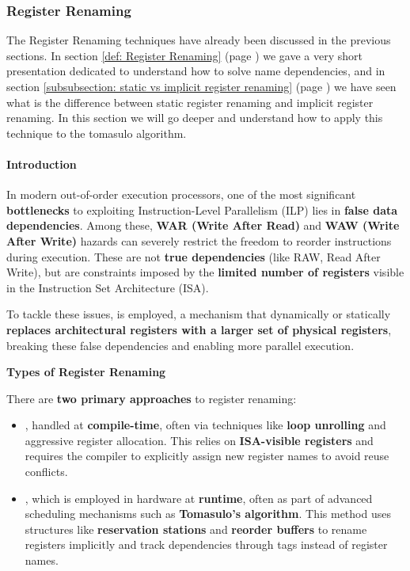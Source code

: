 \subsubsection{Register Renaming}

The Register Renaming techniques have already been discussed in the previous sections. In section \ref{def: Register Renaming} (page \pageref{def: Register Renaming}) we gave a very short presentation dedicated to understand how to solve name dependencies, and in section \ref{subsubsection: static vs implicit register renaming} (page \pageref{subsubsection: static vs implicit register renaming}) we have seen what is the difference between static register renaming and implicit register renaming. In this section we will go deeper and understand how to apply this technique to the tomasulo algorithm.

\paragraph{Introduction}

In modern out-of-order execution processors, one of the most significant \textbf{bottlenecks} to exploiting Instruction-Level Parallelism (ILP) lies in \textbf{false data dependencies}. Among these, \textbf{WAR (Write After Read)} and \textbf{WAW (Write After Write)} hazards can severely restrict the freedom to reorder instructions during execution. These are not \textbf{true dependencies} (like RAW, Read After Write), but are constraints imposed by the \textbf{limited number of registers} visible in the Instruction Set Architecture (ISA).

\highspace
To tackle these issues,  is employed, a mechanism that dynamically or statically \textbf{replaces architectural registers with a larger set of physical registers}, breaking these false dependencies and enabling more parallel execution.

\highspace
\begin{flushleft}
    \textcolor{Green3}{ \textbf{Types of Register Renaming}}
\end{flushleft}
There are \textbf{two primary approaches} to register renaming:
\begin{itemize}
    \item {}, handled at \textbf{compile-time}, often via techniques like \textbf{loop unrolling} and aggressive register allocation. This relies on \textbf{ISA-visible registers} and requires the compiler to explicitly assign new register names to avoid reuse conflicts.

    \item {}, which is employed in hardware at \textbf{runtime}, often as part of advanced scheduling mechanisms such as \textbf{Tomasulo's algorithm}. This method uses structures like \textbf{reservation stations} and \textbf{reorder buffers} to rename registers implicitly and track dependencies through tags instead of register names.
\end{itemize}

